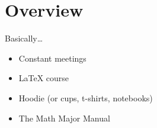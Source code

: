 \begin{frame}
    \maketitle
\end{frame}

\begin{frame}
    
\end{frame}

\section{Overview}

\begin{frame}{Basically\ldots}
    \begin{itemize}
        \item Constant meetings
        \item LaTeX course
        \item Hoodie (or cups, t-shirts, notebooks)
        \item The Math Major Manual
    \end{itemize}
\end{frame}